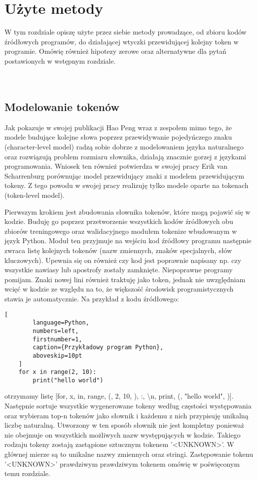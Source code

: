 \newpage %
\section{Użyte metody}
W tym rozdziale opiszę użyte przez siebie metody prowadzące, od zbioru kodów źródłowych programów, do działającej wtyczki 
przewidującej kolejny token w programie. Omówię również hipotezy zerowe oraz alternatywne dla pytań postawionych w wstępnym rozdziale.\\\\\\ 

\subsection{Modelowanie tokenów}
Jak pokazuje w swojej publikacji Hao Peng wraz z zespołem \cite{character-level} mimo tego, że modele budujące kolejne słowa poprzez 
przewidywanie pojedyńczego znaku (character-level model) radzą sobie dobrze z modelowaniem języka naturalnego oraz rozwiązują problem rozmiaru słownika, 
działają znacznie gorzej z językami programowania. Wniosek ten również potwierdza w swojej pracy Erik van Scharrenburg \cite{erik} porównując model przewidujący 
znaki z modelem przewidującym tokeny. Z tego powodu w swojej pracy realizuję tylko modele oparte na tokenach (token-level model). 

Pierwszym krokiem jest zbudowania słownika tokenów, które mogą pojawić się w kodzie. Buduję go poprzez przetworzenie wszystkich kodów źródłowych obu zbiorów treningowego oraz 
walidacyjnego modułem tokenize \cite{tokenize} wbudowanym w język Python. Moduł ten przyjmuje na wejściu kod źródłowy programu następnie zwraca listę kolejnych tokenów (nazw zmiennych, 
znaków specjalnych, słów kluczowych). Upewnia się on również czy kod jest poprawnie napisany np. czy wszystkie nawiasy lub apostrofy zostały zamknięte. Niepoprawne programy pomijam. 
Znaki nowej lini również traktuję jako token, jednak nie uwzględniam wcięć w kodzie ze względu na to, że większość środowisk programistycznych stawia je 
automatycznie. Na przykład z kodu źródłowego: 
\begin{addmargin}[10mm]{0mm}
    \begin{lstlisting}[
        language=Python,
        numbers=left,
        firstnumber=1,
        caption={Przykładowy program Python},
        aboveskip=10pt
    ]
    for x in range(2, 10): 
        print("hello world")
    \end{lstlisting}
    \end{addmargin}
otrzymamy listę [for, x, in, range, (, 2, 10, ), :, \textbackslash n, print, (, "hello world", )].
Następnie sortuje wszystkie wygenerowane tokeny według częstości występowania oraz wybieram top-n tokenów jako słownik i każdemu z nich przypisuję unikalną liczbę naturalną. 
Utworzony w ten sposób słownik nie jest kompletny ponieważ nie obejmuje on wszystkich możliwych nazw występujących w kodzie. Takiego rodzaju tokeny
zostają zastąpione sztucznym tokenem '<UNKNOWN>'. W głównej mierze są to unikalne nazwy zmiennych oraz stringi. Zastępowanie tokenu '<UNKNOWN>' prawdziwym prawdziwym tokenem omówię w 
poświęconym temu rozdziale. 

